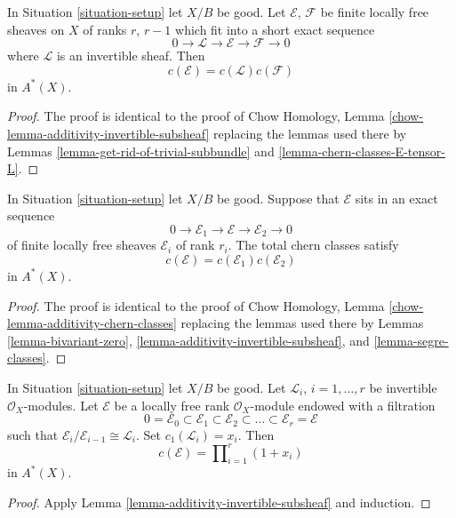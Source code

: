 \begin{lemma}
\label{lemma-additivity-invertible-subsheaf}
In Situation \ref{situation-setup} let $X/B$ be good.
Let $\mathcal{E}$, $\mathcal{F}$ be finite locally free sheaves
on $X$ of ranks $r$, $r - 1$ which fit into a short
exact sequence
$$
0 \to \mathcal{L} \to \mathcal{E} \to \mathcal{F} \to 0
$$
where $\mathcal{L}$ is an invertible sheaf.
Then
$$
c(\mathcal{E}) = c(\mathcal{L}) c(\mathcal{F})
$$
in $A^*(X)$.
\end{lemma}

\begin{proof}
The proof is identical to the proof of
Chow Homology, Lemma \ref{chow-lemma-additivity-invertible-subsheaf}
replacing the lemmas used there by
Lemmas
\ref{lemma-get-rid-of-trivial-subbundle} and
\ref{lemma-chern-classes-E-tensor-L}.
\end{proof}

\begin{lemma}
\label{lemma-additivity-chern-classes}
In Situation \ref{situation-setup} let $X/B$ be good.
Suppose that $\mathcal{E}$ sits in an exact sequence
$$
0
\to
\mathcal{E}_1
\to
\mathcal{E}
\to
\mathcal{E}_2
\to
0
$$
of finite locally free sheaves $\mathcal{E}_i$ of rank $r_i$.
The total chern classes satisfy
$$
c(\mathcal{E}) = c(\mathcal{E}_1) c(\mathcal{E}_2)
$$
in $A^*(X)$.
\end{lemma}

\begin{proof}
The proof is identical to the proof of
Chow Homology, Lemma \ref{chow-lemma-additivity-chern-classes}
replacing the lemmas used there by
Lemmas \ref{lemma-bivariant-zero},
\ref{lemma-additivity-invertible-subsheaf}, and
\ref{lemma-segre-classes}.
\end{proof}

\begin{lemma}
\label{lemma-chern-filter-by-linebundles}
In Situation \ref{situation-setup} let $X/B$ be good.
Let ${\mathcal L}_i$, $i = 1, \ldots, r$ be invertible
$\mathcal{O}_X$-modules.
Let $\mathcal{E}$ be a locally free rank
$\mathcal{O}_X$-module endowed with a filtration
$$
0 = \mathcal{E}_0 \subset \mathcal{E}_1 \subset \mathcal{E}_2
\subset \ldots \subset \mathcal{E}_r = \mathcal{E}
$$
such that $\mathcal{E}_i/\mathcal{E}_{i - 1} \cong \mathcal{L}_i$.
Set $c_1({\mathcal L}_i) = x_i$. Then
$$
c(\mathcal{E})
=
\prod\nolimits_{i = 1}^r (1 + x_i)
$$
in $A^*(X)$.
\end{lemma}

\begin{proof}
Apply Lemma \ref{lemma-additivity-invertible-subsheaf} and induction.
\end{proof}






















